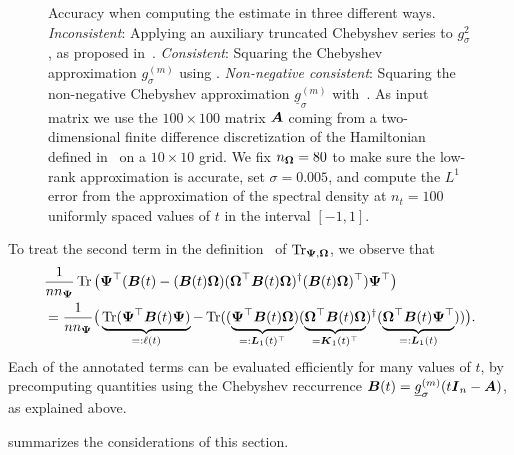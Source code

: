 \begin{figure}[ht]
    \centering
    
    \caption{Accuracy when computing the estimate  in three different ways. \emph{Inconsistent}: Applying an auxiliary truncated Chebyshev series to $g_{\sigma}^2$, as proposed in~\cite{lin-2017-randomized-estimation}. \emph{Consistent}: Squaring the Chebyshev approximation $g_{\sigma}^{(m)}$ using . \emph{Non-negative consistent}: Squaring the non-negative Chebyshev approximation $\underline{g}_{\sigma}^{(m)}$ with~. As input matrix we use the $100 \times 100$ matrix $\boldsymbol{A}$ coming from a two-dimensional finite difference discretization of the Hamiltonian defined in~ on a $10 \times 10$ grid. We fix $n_{\boldsymbol{\Omega}} = 80$ to make sure the low-rank approximation is accurate, set $\sigma = 0.005$, and compute the $L^1$ error from the approximation of the spectral density at $n_t = 100$ uniformly spaced values of $t$ in the interval $[-1, 1]$.}
    \label{fig:interpolation-issue}
\end{figure}

To treat the second term in the definition~ of $\operatorname{Tr}_{\boldsymbol{\Psi}, \boldsymbol{\Omega}}$, we observe that 
\begin{align}
    &\frac{1}{n n_{\boldsymbol{\Psi}}} \operatorname{Tr} \big(\boldsymbol{\Psi}^{\top} (\boldsymbol{B}(t) - (\boldsymbol{B}(t) \boldsymbol{\Omega}) (\boldsymbol{\Omega}^{\top} \boldsymbol{B}(t) \boldsymbol{\Omega})^{\dagger} (\boldsymbol{B}(t) \boldsymbol{\Omega})^{\top}) \boldsymbol{\Psi}^{\top} \big) \notag \\
    &= \frac{1}{n n_{\boldsymbol{\Psi}}} \big( \underbrace{\operatorname{Tr}(\boldsymbol{\Psi}^{\top} \boldsymbol{B}(t)\boldsymbol{\Psi})}_{=: \ell(t)} - \operatorname{Tr}((\underbrace{\boldsymbol{\Psi}^{\top} \boldsymbol{B}(t) \boldsymbol{\Omega}}_{=: \boldsymbol{L}_1(t)^{\top}}) (\underbrace{\boldsymbol{\Omega}^{\top} \boldsymbol{B}(t) \boldsymbol{\Omega}}_{= \boldsymbol{K}_1(t)^{\top}})^{\dagger} (\underbrace{\boldsymbol{\Omega}^{\top} \boldsymbol{B}(t) \boldsymbol{\Psi}^{\top}}_{=: \boldsymbol{L}_1(t)})) \big).
    \label{equ:cyclic-property-hutchinson}
\end{align}
Each of the annotated terms can be evaluated efficiently for many values of $t$, by precomputing quantities using the Chebyshev reccurrence 
$\boldsymbol{B}(t) = \underline{g}_{\sigma}^{(m)}(t \boldsymbol{I}_n - \boldsymbol{A})$, as explained above.

 summarizes the considerations of this section.

